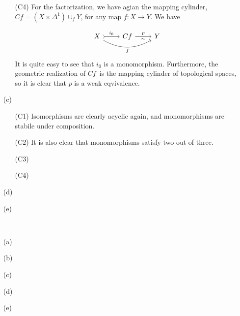 \begin{exercise}[2]
\begin{enumerate}
\begin{enumerate}
\item[(C4)]
For the factorization, we have agian the mapping cylinder, 
$Cf = (X\times \Delta^1) \cup_f Y$, for any map $f: X \to Y$. We have 

\[ \begin{tikzcd}
X \ar[r, rightarrowtail, "i_0"] \ar[rr, bend right, "f"']
& Cf \ar[r, "p", "\sim"'] 
& Y 
\end{tikzcd} \]
It is quite easy to see that $i_0$ is a monomorphism. Furthermore, the geometric
realization of $Cf$ is the mapping cylinder of topological spaces, so it is
clear that $p$ is a weak eqvivalence.

\end{enumerate}

\item[(c)] 
\begin{enumerate}
\item[(C1)] 
Isomorphisms are clearly acyclic again, and monomorphisms are stabile under
composition.

\item[(C2)] 
It is also clear that monomorphisms satisfy two out of three.

\item[(C3)] 

\item[(C4)] 


\end{enumerate}

\item[(d)] 
\item[(e)] 
\end{enumerate}
\end{exercise}

\begin{exercise}[3]\ 
\begin{enumerate}
\item[(a)] 
\item[(b)] 
\item[(c)] 
\item[(d)] 
\item[(e)] 
\end{enumerate}
\end{exercise}


